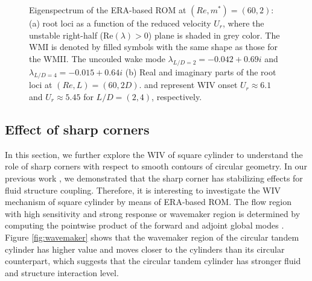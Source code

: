 \begin{figure}
\begin{subfigure}{0.495\textwidth}
    \caption{}
    \label{•}
    \end{subfigure} 
  \caption{Eigenspectrum of the ERA-based ROM at $(Re,m^*)=(60,2)$: 
     (a) root loci as a function of the reduced velocity $U_r$, 
     where the unstable right-half (Re$(\lambda) > 0$) plane is shaded in grey color.
     The WMI is denoted by filled symbols with the same shape as those for the WMII. 
     The uncouled wake mode $\lambda_{L/D=2}=-0.042+0.69i$ and $\lambda_{L/D=4}=-0.015+0.64i$
     (b) Real and imaginary parts of the root loci at $(Re,L)=(60,2D)$.     
     {\protect\reddash} and {\protect\bluedash} represent WIV onset $U_r \approx 6.1$ 
      and $U_r \approx 5.45$ for $L/D=(2,4)$, respectively.}
\label{fig:dfl_eig}  
\end{figure}



\subsection{Effect of sharp corners}\label{sec:WIV_square}

In this section, we further explore the WIV of square cylinder to understand the role of sharp corners with respect to 
smooth contours of circular geometry. In our previous work \cite{yao_jfm_1}, 
we demonstrated that the sharp corner has stabilizing effects for fluid structure coupling. Therefore, 
it is interesting to investigate the WIV mechanism of square cylinder by means of ERA-based ROM.
The flow region with high sensitivity and strong response or wavemaker region is determined by computing the pointwise 
product of the forward and adjoint global modes \cite{Luchini2007}. 
Figure \ref{fig:wavemaker} shows that the wavemaker region of the circular tandem cylinder has higher value and 
moves closer to the cylinders than its circular counterpart, which suggests that the circular tandem cylinder 
has stronger fluid and structure interaction level. 


